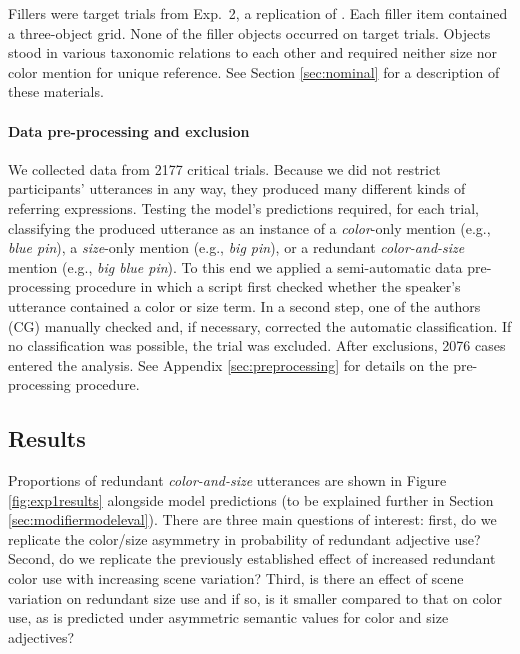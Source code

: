 \documentclass[11pt]{article}
\newcommand{\figref}[1]{Figure \ref{#1}}
\newcommand{\appref}[1]{Appendix \ref{#1}}
\newcommand{\sectionref}[1]{Section \ref{#1}}
\begin{document}
Fillers were target trials from Exp.~2, a replication of . Each filler item contained a three-object grid. None of the filler objects occurred on target trials. Objects stood in various taxonomic relations to each other and required neither size nor color mention for unique reference. See \sectionref{sec:nominal} for a description of these materials.

\paragraph{Data pre-processing and exclusion}

We collected data from 2177 critical trials. Because we did not restrict participants' utterances in any way, they produced many different kinds of referring expressions. Testing the model's predictions required, for each trial, classifying the produced utterance as an instance of a \emph{color}-only mention (e.g., \emph{blue pin}), a \emph{size}-only mention (e.g., \emph{big pin}), or a redundant \emph{color-and-size} mention (e.g., \emph{big blue pin}). To this end we applied a semi-automatic data pre-processing procedure in which a script first checked whether the speaker's utterance contained a color or size term. In a second step,  one of the authors (CG)  manually checked and, if necessary, corrected the automatic classification. If no classification was possible, the trial was excluded. After exclusions, 2076 cases entered the analysis.  See \appref{sec:preprocessing} for details on the pre-processing procedure.

\subsection{Results}
\label{sec:modelempiricalresults}

Proportions of redundant \emph{color-and-size} utterances are shown in \figref{fig:exp1results} alongside model predictions (to be explained further in \sectionref{sec:modifiermodeleval}). There are three main questions of interest: first, do we replicate the color/size asymmetry in probability of redundant adjective use? Second, do we replicate the previously established effect of increased redundant color use with increasing scene variation? Third, is there an effect of scene variation on redundant size use and if so, is it smaller compared to that on color use, as is predicted under asymmetric semantic values for color and size adjectives?
\end{document}

